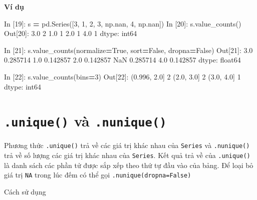 \documentclass[
]{book}
\newenvironment{Shaded}{\begin{snugshade}}{\end{snugshade}}
\newcommand{\DecValTok}[1]{\textcolor[rgb]{0.00,0.00,0.81}{#1}}
\newcommand{\FloatTok}[1]{\textcolor[rgb]{0.00,0.00,0.81}{#1}}
\newcommand{\NormalTok}[1]{#1}
\newcommand{\OperatorTok}[1]{\textcolor[rgb]{0.81,0.36,0.00}{\textbf{#1}}}
\newcommand{\VariableTok}[1]{\textcolor[rgb]{0.00,0.00,0.00}{#1}}
\begin{document}
\textbf{Ví dụ}

\begin{Shaded}
\begin{Highlighting}[]
\NormalTok{In [}\DecValTok{19}\NormalTok{]: s }\OperatorTok{=}\NormalTok{ pd.Series([}\DecValTok{3}\NormalTok{, }\DecValTok{1}\NormalTok{, }\DecValTok{2}\NormalTok{, }\DecValTok{3}\NormalTok{,  np.nan, }\DecValTok{4}\NormalTok{, np.nan])}
\NormalTok{In [}\DecValTok{20}\NormalTok{]: s.value\_counts()}
\NormalTok{Out[}\DecValTok{20}\NormalTok{]: }
\FloatTok{3.0}    \DecValTok{2}
\FloatTok{1.0}    \DecValTok{1}
\FloatTok{2.0}    \DecValTok{1}
\FloatTok{4.0}    \DecValTok{1}
\NormalTok{dtype: int64}

\NormalTok{In [}\DecValTok{21}\NormalTok{]: s.value\_counts(normalize}\OperatorTok{=}\VariableTok{True}\NormalTok{, sort}\OperatorTok{=}\VariableTok{False}\NormalTok{, dropna}\OperatorTok{=}\VariableTok{False}\NormalTok{)}
\NormalTok{Out[}\DecValTok{21}\NormalTok{]:}
\FloatTok{3.0}    \FloatTok{0.285714}
\FloatTok{1.0}    \FloatTok{0.142857}
\FloatTok{2.0}    \FloatTok{0.142857}
\NormalTok{NaN    }\FloatTok{0.285714}
\FloatTok{4.0}    \FloatTok{0.142857}
\NormalTok{dtype: float64}

\NormalTok{In [}\DecValTok{22}\NormalTok{]: s.value\_counts(bins}\OperatorTok{=}\DecValTok{3}\NormalTok{)}
\NormalTok{Out[}\DecValTok{22}\NormalTok{]:}
\NormalTok{(}\FloatTok{0.996}\NormalTok{, }\FloatTok{2.0}\NormalTok{]    }\DecValTok{2}
\NormalTok{(}\FloatTok{2.0}\NormalTok{, }\FloatTok{3.0}\NormalTok{]      }\DecValTok{2}
\NormalTok{(}\FloatTok{3.0}\NormalTok{, }\FloatTok{4.0}\NormalTok{]      }\DecValTok{1}
\NormalTok{dtype: int64}
\end{Highlighting}
\end{Shaded}

\hypertarget{unique-vuxe0-.nunique}{%
\section{\texorpdfstring{\texttt{.unique()} và \texttt{.nunique()}}{.unique() và .nunique()}}\label{unique-vuxe0-.nunique}}

Phương thức \texttt{.unique()} trả về các giá trị khác nhau của \texttt{Series} và \texttt{.nunique()} trả về số lượng các giá trị khác nhau của \texttt{Series}. Kết quả trả về của \texttt{.unique()} là danh sách các phần tử được sắp xếp theo thứ tự đầu vào của bảng. Để loại bỏ giá trị \texttt{NA} trong lúc đếm có thể gọi \texttt{.nunique(dropna=False)}

Cách sử dụng
\end{document}
